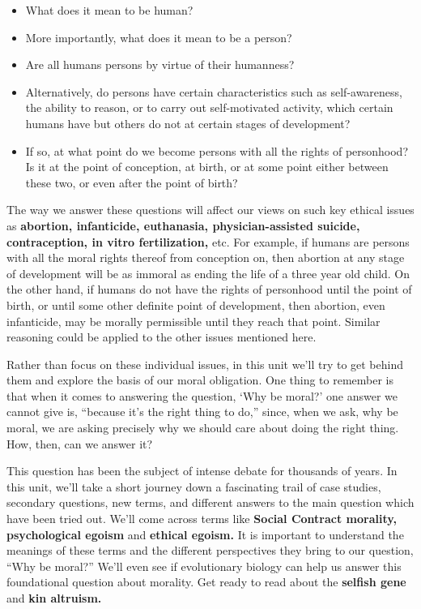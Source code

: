 \documentclass[
]{book}
\providecommand{\tightlist}{%
  \setlength{\itemsep}{0pt}\setlength{\parskip}{0pt}}
\begin{document}
\begin{itemize}
\tightlist
\item
  What does it mean to be human?
\item
  More importantly, what does it mean to be a person?
\item
  Are all humans persons by virtue of their humanness?
\item
  Alternatively, do persons have certain characteristics such as self-awareness, the ability to reason, or to carry out self-motivated activity, which certain humans have but others do not at certain stages of development?
\item
  If so, at what point do we become persons with all the rights of personhood? Is it at the point of conception, at birth, or at some point either between these two, or even after the point of birth?
\end{itemize}

The way we answer these questions will affect our views on such key ethical issues as \textbf{abortion, infanticide, euthanasia, physician-assisted suicide, contraception, in vitro fertilization,} etc. For example, if humans are persons with all the moral rights thereof from conception on, then abortion at any stage of development will be as immoral as ending the life of a three year old child. On the other hand, if humans do not have the rights of personhood until the point of birth, or until some other definite point of development, then abortion, even infanticide, may be morally permissible until they reach that point. Similar reasoning could be applied to the other issues mentioned here.

Rather than focus on these individual issues, in this unit we'll try to get behind them and explore the basis of our moral obligation. One thing to remember is that when it comes to answering the question, `Why be moral?' one answer we cannot give is, ``because it's the right thing to do,'' since, when we ask, why be moral, we are asking precisely why we should care about doing the right thing. How, then, can we answer it?

This question has been the subject of intense debate for thousands of years. In this unit, we'll take a short journey down a fascinating trail of case studies, secondary questions, new terms, and different answers to the main question which have been tried out. We'll come across terms like \textbf{Social Contract morality, psychological egoism} and \textbf{ethical egoism.} It is important to understand the meanings of these terms and the different perspectives they bring to our question, ``Why be moral?'' We'll even see if evolutionary biology can help us answer this foundational question about morality. Get ready to read about the \textbf{selfish gene} and \textbf{kin altruism.}
\end{document}

